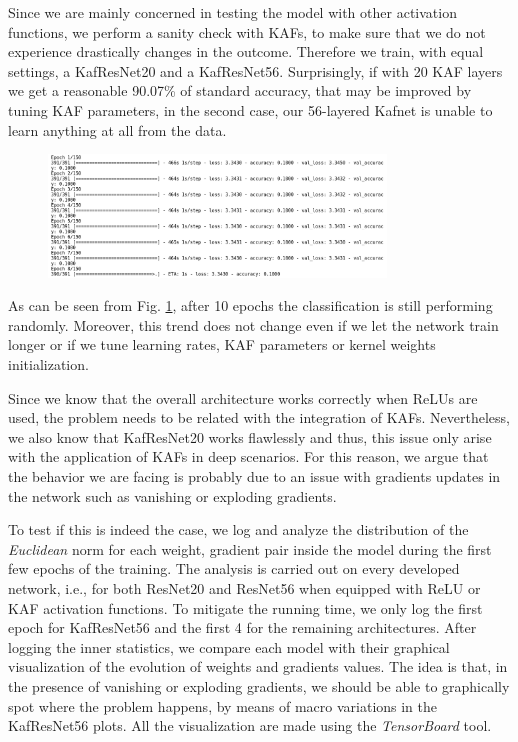 \documentclass[LaM,binding=0.6cm]{./packages/sapthesis/sapthesis}
\begin{document}
        Since we are mainly concerned in testing the model with other activation functions, we perform a sanity check with KAFs, to make sure that we do not experience drastically 
        changes in the outcome. Therefore we train, with equal settings, a KafResNet20 and a KafResNet56. Surprisingly, if with 20 KAF layers we get a reasonable 90.07\% of standard accuracy, that may be 
        improved by tuning KAF parameters, in the second case, our 56-layered Kafnet is unable to learn anything at all from the data. 
        \begin{figure}[h!]
            \centering
            \includegraphics[width=0.8\textwidth]{explgrad.png}
            \caption{}
            \label{fig:explgrad}
        \end{figure} 
        As can be seen from Fig. \ref{fig:explgrad}, after 10 epochs the classification is still performing randomly. Moreover, this trend does not change even if we let the network train longer or if we tune learning rates, KAF parameters 
        or kernel weights initialization. 
        
        Since we know that the overall architecture works correctly when ReLUs are used, the problem needs to be related with the integration of KAFs. Nevertheless, we also know that KafResNet20 works flawlessly and thus,
        this issue only arise with the application of KAFs in deep scenarios. For this reason, we argue that the behavior we are facing is probably due to an issue with gradients updates in the network such as 
        vanishing or exploding gradients.

        To test if this is indeed the case, we log and analyze the distribution of the \textit{Euclidean} norm for each weight, gradient pair inside the model during the first few epochs of the training. The analysis is carried out 
        on every developed network, i.e., for both ResNet20 and ResNet56 when equipped with ReLU or KAF activation functions. To mitigate the running time, we only log the first epoch for KafResNet56 and the first 4 for the remaining architectures.
        After logging the inner statistics, we compare each model with their graphical visualization of the
        evolution of weights and gradients values. The idea is that, in the presence of vanishing or exploding gradients, we should be able to graphically spot where the problem happens, by means of macro variations in the 
        KafResNet56 plots. All the visualization are made using the \textit{TensorBoard} tool.
        
\end{document}
